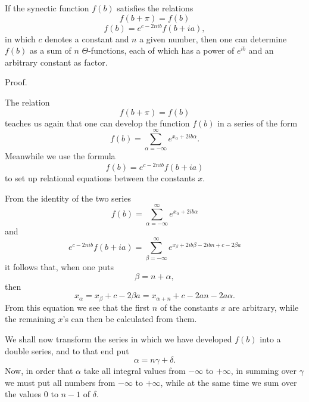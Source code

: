 \documentclass[10pt]{article}
\newcommand{\sourceanchor}[1]{\hypertarget{source-#1}{}}
\begin{document}
If the synectic function \(f(b)\) satisfies the relations
\[
f(b+\pi)=f(b)
\]
\[
f(b)=e^{c-2nib}f(b+ia),
\]
in which \(c\) denotes a constant and \(n\) a given number, then one can determine \(f(b)\) as a sum of \(n\) \(\Theta\)-functions, each of which has a power of \(e^{ib}\) and an arbitrary constant as factor.

\begin{center}Proof.\end{center}
The relation
\[
f(b+\pi)=f(b)
\]
teaches us again that one can develop the function \(f(b)\) in a series of the form
\sourceanchor{PA05}
\begin{equation*}
 f(b)=\sum_{\alpha=-\infty}^{\infty}e^{x_{\alpha}+2ib\alpha}.
\tag{1}
\end{equation*}
Meanwhile we use the formula
\[
f(b)=e^{c-2nib}f(b+ia)
\]
to set up relational equations between the constants \(x\).

From the identity of the two series
\[
f(b)=\sum_{\alpha=-\infty}^{\infty}e^{x_{\alpha}+2ib\alpha}
\]
and
\[
e^{c-2nib}f(b+ia)=\sum_{\beta=-\infty}^{\infty}e^{x_{\beta}+2ib\beta-2ibn+c-2\beta a}
\]
it follows that, when one puts
\[
\beta=n+\alpha,
\]
then
\[
x_{\alpha}=x_{\beta}+c-2\beta a=x_{\alpha+n}+c-2an-2a\alpha.
\]
From this equation we see that the first \(n\) of the constants \(x\) are arbitrary, while the remaining \(x\)'s can then be calculated from them.

We shall now transform the series in which we have developed \(f(b)\) into a double series, and to that end put
\[
\alpha=n\gamma+\delta.
\]
Now, in order that \(\alpha\) take all integral values from \(-\infty\) to \(+\infty\), in summing over \(\gamma\) we must put all numbers from \(-\infty\) to \(+\infty\), while at the same time we sum over the values 0 to \(n-1\) of \(\delta\).
\end{document}
